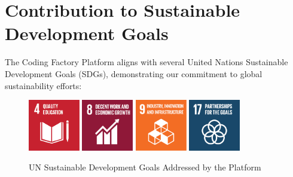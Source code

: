 \documentclass[12pt,a4paper]{report}
\begin{document}
\section{Contribution to Sustainable Development Goals}

The Coding Factory Platform aligns with several United Nations Sustainable Development Goals (SDGs), demonstrating our commitment to global sustainability efforts:

\begin{figure}[ht]
\centering
\includegraphics[width=0.2\textwidth]{media/sdg4.png}
\includegraphics[width=0.2\textwidth]{media/sdg8.png}
\includegraphics[width=0.2\textwidth]{media/sdg9.png}
\includegraphics[width=0.2\textwidth]{media/sdg17.png}
\caption{UN Sustainable Development Goals Addressed by the Platform}
\label{fig:sdg-logos}
\end{figure}
\end{document}
